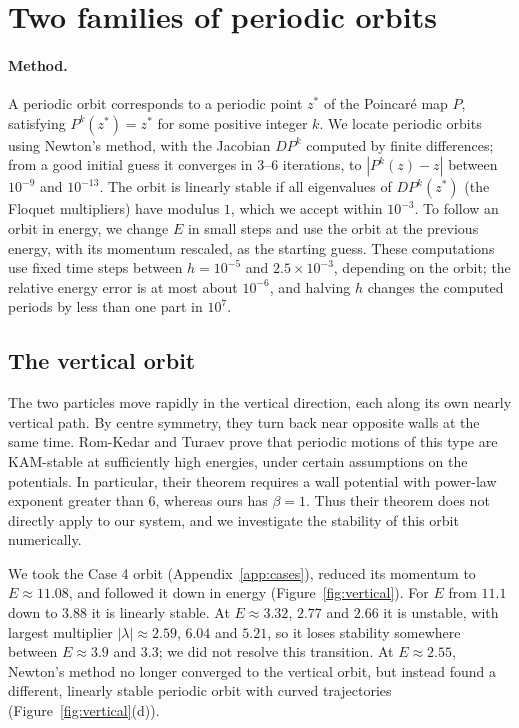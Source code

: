 \documentclass[11pt,a4paper]{article}
\begin{document}
\section{Two families of periodic orbits}\label{app:orbits}
\paragraph{Method.}
A periodic orbit corresponds to a periodic point $z^*$
of the Poincar\'e map $P$, satisfying
$P^k(z^*)=z^*$ for some positive integer $k$.
We locate periodic orbits using Newton's method, with the Jacobian
$DP^k$ computed by finite differences; from a good initial guess it converges in
3--6 iterations, to $|P^k(z)-z|$ between $10^{-9}$ and $10^{-13}$. The orbit is
linearly stable if all eigenvalues of $DP^k(z^*)$ (the Floquet multipliers)
have modulus $1$, which we accept within $10^{-3}$. To follow an orbit in
energy, we change $E$ in small steps and use the orbit at the previous energy,
with its momentum rescaled, as the starting guess. These computations use
fixed time steps between $h=10^{-5}$ and $2.5\times10^{-3}$, depending on the
orbit; the relative energy error is at most about $10^{-6}$, and halving $h$
changes the computed periods by less than one part in $10^7$.

\subsection{The vertical orbit}\label{app:vertical}
The two particles move rapidly in the vertical direction, each along
its own nearly vertical path. By centre symmetry, they turn back
near opposite walls at the same time. Rom-Kedar and Turaev
\cite[Theorem~5]{turaev2022} prove that periodic motions of this type
are KAM-stable at sufficiently high energies, under certain
assumptions on the potentials. In particular, their theorem requires
a wall potential with power-law exponent greater than $6$, whereas
ours has $\beta=1$. Thus their theorem does not directly apply to
our system, and we investigate the stability of this orbit numerically.

We took the Case 4 orbit (Appendix~\ref{app:cases}), reduced its momentum to $E\approx11.08$, and followed it down in energy (Figure~\ref{fig:vertical}). For $E$ from $11.1$ down to $3.88$ it
is linearly stable. At $E\approx3.32$, $2.77$ and $2.66$ it is unstable, with
largest multiplier $|\lambda|\approx2.59$, $6.04$ and $5.21$, so it loses
stability somewhere between $E\approx3.9$ and $3.3$; we did not resolve this
transition. At $E\approx2.55$, Newton's method no longer converged
to the vertical orbit, but instead found a different,
linearly stable periodic orbit with curved trajectories
(Figure~\ref{fig:vertical}(d)).
\end{document}
